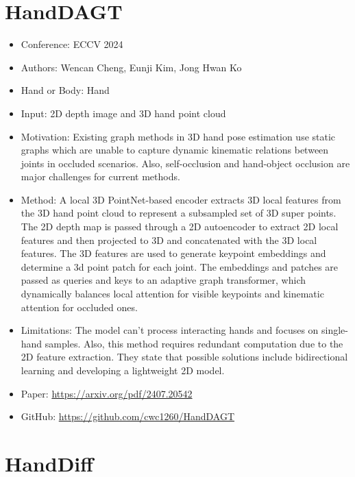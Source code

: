 \documentclass{article}
\begin{document}
\section*{HandDAGT}

\begin{itemize}
    \item Conference: ECCV 2024
    \item Authors: Wencan Cheng, Eunji Kim, Jong Hwan Ko
    \item Hand or Body: Hand
    \item Input: 2D depth image and 3D hand point cloud
    \item Motivation: Existing graph methods in 3D hand pose estimation use static graphs which are unable to capture dynamic kinematic relations between joints in occluded scenarios. Also, self-occlusion and hand-object occlusion are major challenges for current methods.
    \item Method: A local 3D PointNet-based encoder extracts 3D local features from the 3D hand point cloud to represent a subsampled set of 3D super points. The 2D depth map is passed through a 2D autoencoder to extract 2D local features and then projected to 3D and concatenated with the 3D local features. The 3D features are used to generate keypoint embeddings and determine a 3d point patch for each joint. The embeddings and patches are passed as queries and keys to an adaptive graph transformer, which dynamically balances local attention for visible keypoints and kinematic attention for occluded ones.
    \item Limitations: The model can't process interacting hands and focuses on single-hand samples. Also, this method requires redundant computation due to the 2D feature extraction. They state that possible solutions include bidirectional learning and developing a lightweight 2D model.
    \item Paper: \url{https://arxiv.org/pdf/2407.20542}
    \item GitHub: \url{https://github.com/cwc1260/HandDAGT}
\end{itemize}

\section*{HandDiff}
\end{document}
